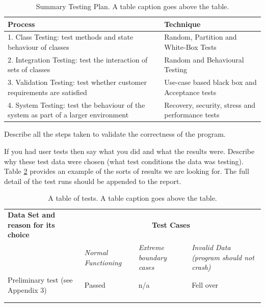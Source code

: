 \documentclass[11pt,a4paper]{article}
\begin{document}
\begin{table}[h!]
  \centering
\caption{Summary Testing Plan. A table caption goes above the table.}

\begin{tabular}[t]{|p{8cm}|p{7cm}|} \hline

  \textbf{Process} & \textbf{Technique} \\ \hline 1. Class
    Testing: test methods and state behaviour of classes & Random,
    Partition and White-Box Tests \\ \hline 2. Integration Testing:
    test the
    interaction of sets of classes & Random and Behavioural Testing \\
    \hline 3. Validation Testing: test whether customer requirements
    are satisfied & Use-case based black box and Acceptance tests \\
    \hline 4. System Testing: test the behaviour of the system as part
    of a larger environment & Recovery, security, stress and
    performance tests \\ \hline

\end{tabular}

\label{tab:test-plan}
\end{table}
Describe all the steps taken to validate the correctness of the
program.

If you had user tests then say what you did and what the results
were. Describe why these test data were chosen (what test conditions
the data was testing).  Table \ref{tab:tests} provides an example of
the sorts of results we are looking for. The full detail of the test
runs should be appended to the report.

\begin{table}[h!]
  \centering
\caption{A table of tests. A table caption goes above the table.}

  \begin{tabular}[t]{|p{5.5cm}|p{3cm}|p{3cm}|p{3cm}|} \hline \textbf{Data Set
    and reason for its choice} & \multicolumn{3}{c|}{\textbf{Test Cases}}\\
    \cline{2-4} & \emph{Normal Functioning} & \emph{Extreme boundary cases} &
    \emph{Invalid Data (program should not crash)} \\ \hline Preliminary test
    (see Appendix 3) & Passed & n/a & Fell over \\\hline &&&\\ \hline
    &&&\\ \hline
  \end{tabular}

\label{tab:tests}
\end{table}
\end{document}
